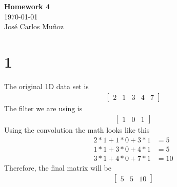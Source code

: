 \documentclass[12pt,english]{article}
\begin{document}
\begin{center}
    \Large
    \textbf{Homework 4}\\
    \small
    \today\\
    \large
    Jos\'{e} Carlos Mu\~{n}oz
\end{center}
\section*{1}
The original 1D data set is
\begin{align*}
\begin{bmatrix} 2 & 1 & 3 & 4 & 7\end{bmatrix}
\end{align*}
The filter we are using is
\begin{align*}
\begin{bmatrix} 1 & 0 & 1\end{bmatrix}
\end{align*}
Using the convolution the math looks like this
\begin{align*}
 2 * 1 + 1 * 0 + 3 * 1 & = 5\\
 1 * 1 + 3 * 0 + 4 * 1 & = 5\\
 3 * 1 + 4 * 0 + 7 * 1 & = 10
\end{align*}
Therefore, the final matrix will be
\begin{align*}
\begin{bmatrix} 5 & 5 & 10\end{bmatrix}
\end{align*}
\end{document}
